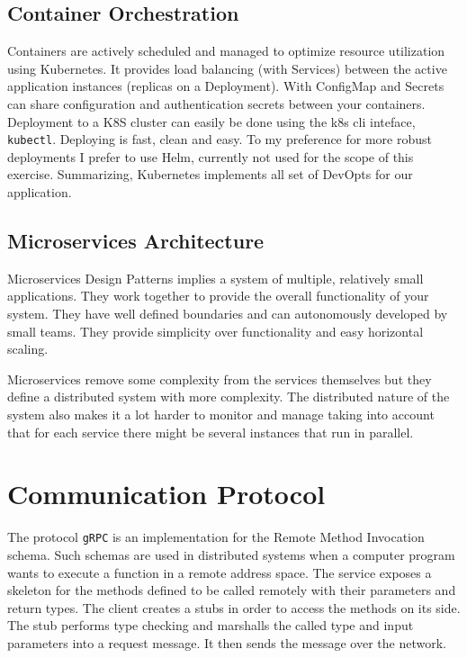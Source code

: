\documentclass[a4paper,10pt]{article}
\begin{document}
\subsection{Container Orchestration}
Containers are actively scheduled and managed to optimize resource utilization using Kubernetes. It provides load balancing (with Services) between the active application instances (replicas on a Deployment). With ConfigMap and Secrets can share configuration and authentication secrets between your containers.
Deployment to a K8S cluster can easily be done using the k8s cli inteface, \texttt{kubectl}. Deploying is fast, clean and easy. To my preference for more robust deployments I prefer to use Helm, 
currently not used for the scope of this exercise. Summarizing, Kubernetes implements all set of DevOpts for our application.


\subsection{Microservices Architecture}
Microservices Design Patterns implies  a system of multiple, relatively small applications. They work together to provide the overall functionality of your system. They 
have well defined boundaries and can autonomously developed by small teams. They provide 
simplicity over functionality and easy horizontal scaling.

Microservices remove some complexity from the services themselves but they define a distributed system with more complexity. The distributed nature of the system also makes it a lot harder to monitor and manage taking into account that for each service there might be several instances that run in parallel.




\section{Communication Protocol}
The protocol \texttt{gRPC} is an implementation for the Remote Method Invocation schema. Such schemas are used in distributed systems when a computer program wants to execute a function in a remote address space. The service exposes a skeleton for the methods 
defined to be called remotely with their parameters and return types. The client 
creates a stubs in order to access the methods on its side. The stub performs type 
checking and marshalls the called type and input parameters into a request message. 
It then sends the message over the network.
\end{document}
